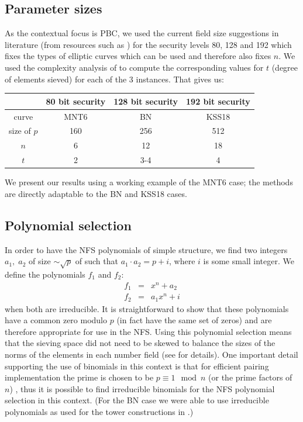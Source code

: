\documentclass[a4paper, 12pt, envcountsect, runningheads]{llncs}
\numberwithin{figure}{section}
\numberwithin{equation}{section}
\begin{document}
\subsection*{Parameter sizes}
As the contextual focus is PBC, we used the current field size suggestions in literature (from resources such as \cite{lenstra-verheul,lenstra01,ECRYPT_key_sizes}) for the security levels 80, 128 and 192 which fixes the types of elliptic curves which can be used and therefore also fixes $n$. We used the complexity analysis of \cite{joux-lercier-smart-vercauteren06} to compute the corresponding values for $t$ (degree of elements sieved) for each of the 3 instances. That gives us:
\begin{center}
\begin{tabular}{|c|c|c|c|}
\hline
&80 bit security & 128 bit security & 192 bit security\\
\hline
curve & MNT6 & BN & KSS18\\
size of $p$ & 160 & 256 & 512\\
$n$ & 6 & 12 & 18\\
$t$ & 2 & 3-4 & 4\\
\hline
\end{tabular}
\end{center}
We present our results using a working example of the MNT6 case; the methods are directly adaptable to the BN and KSS18 cases. 
\subsection{Polynomial selection}
\label{ss:poly_selection}
In order to have the NFS polynomials of simple structure, we find two integers $a_1,\;a_2$ of size $\sim\sqrt{p}$ of such that $a_1\cdot a_2=p+i$, where $i$ is some small integer. We define the polynomials $f_1$ and $f_2$:
\begin{eqnarray*}
f_1 &=& x^n + a_2\\
f_2 &=& a_1 x^n + i
\end{eqnarray*}
when both are irreducible. It is straightforward to show that these polynomials have a common zero modulo $p$ (in fact have the same set of zeros) and are therefore appropriate for use in the NFS. Using this polynomial selection means that the sieving space did not need to be skewed to balance the sizes of the norms of the elements in each number field (see \cite{joux-lercier-smart-vercauteren06} for details). One important detail supporting the use of binomials in this context is that for efficient pairing implementation the prime is chosen to be $p\equiv1\mod n$ (or the prime factors of $n$) \cite{koblitz-menezes05}, thus it is possible to find irreducible binomials for the NFS polynomial selection in this context. (For the BN case we were able to use irreducible polynomials as used for the tower constructions in \cite{towers}.) %
\end{document}
